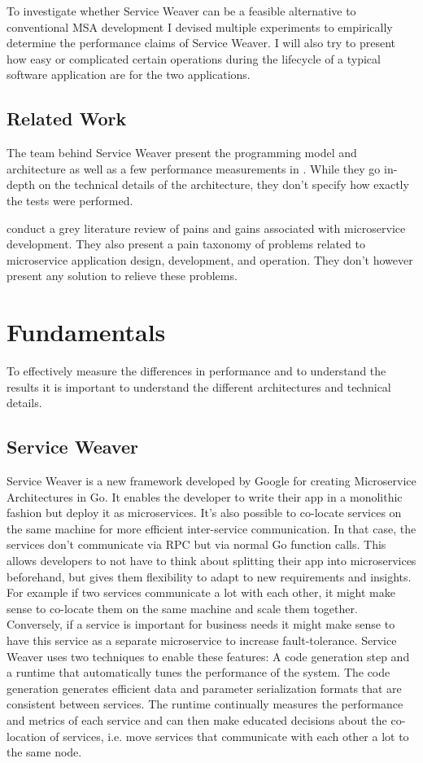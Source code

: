 \documentclass[sigconf,review,9pt]{acmart}
\begin{document}
To investigate whether Service Weaver can be a feasible alternative to conventional
MSA development I devised multiple experiments to empirically determine the performance
claims of Service Weaver.
I will also try to present how easy or complicated certain operations during the
lifecycle of a typical software application are for the two applications.

\subsection{Related Work}
The team behind Service Weaver present the programming model and architecture
as well as a few performance measurements in \cite{service_weaver_paper}.
While they go in-depth on the technical details of the architecture, they don't
specify how exactly the tests were performed.

 conduct a grey literature review of pains and gains
associated with microservice development.
They also present a pain taxonomy of problems related to microservice application
design, development, and operation.
They don't however present any solution to relieve these problems.

\section{Fundamentals}

To effectively measure the differences in performance and to understand the results
it is important to understand the different architectures and technical details.

\subsection{Service Weaver}
Service Weaver is a new framework developed by Google for creating Microservice
Architectures in Go. \cite{serviceWeaverSite}
It enables the developer to write their app in a monolithic fashion but deploy it as microservices.
It's also possible to co-locate services on the same machine for more efficient
inter-service communication.
In that case, the services don't communicate via RPC but via normal Go function calls.
This allows developers to not have to think about splitting their app into microservices
beforehand, but gives them flexibility to adapt to new requirements and insights.
For example if two services communicate a lot with each other, it might make sense
to co-locate them on the same machine and scale them together.
Conversely, if a service is important for business needs it might make sense to
have this service as a separate microservice to increase fault-tolerance.
Service Weaver uses two techniques to enable these features:
A code generation step and a runtime that automatically tunes the performance
of the system.
The code generation generates efficient data and parameter serialization formats
that are consistent between services.
The runtime continually measures the performance and metrics of each service and
can then make educated decisions about the co-location of services, i.e.
move services that communicate with each other a lot to the same node.
\end{document}
